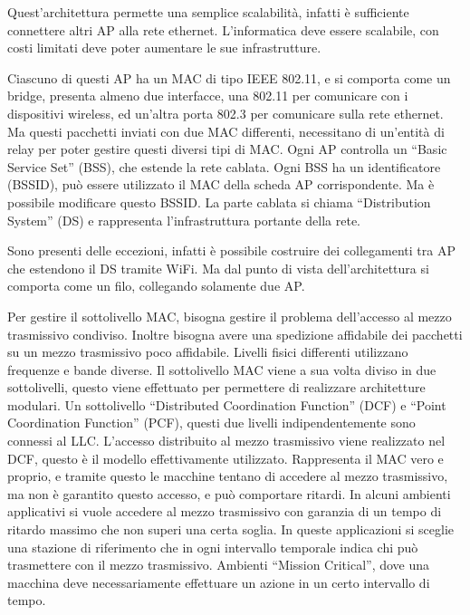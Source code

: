 \documentclass{article}
\numberwithin{equation}{subsection}
\begin{document}

Quest'architettura permette una semplice scalabilità, infatti è sufficiente connettere altri AP alla rete ethernet. 
L'informatica deve essere scalabile, con costi limitati deve poter aumentare le sue infrastrutture.  


Ciascuno di questi AP ha un MAC di tipo IEEE 802.11, e si comporta come un bridge, presenta almeno due interfacce, una 802.11 per comunicare con i dispositivi wireless, 
ed un'altra porta 802.3 per comunicare sulla rete ethernet. Ma questi pacchetti inviati con due MAC differenti, necessitano di un'entità di relay per poter 
gestire questi diversi tipi di MAC. Ogni AP controlla un ``Basic Service Set'' (BSS), che estende la rete cablata. Ogni BSS ha un identificatore (BSSID), può essere 
utilizzato il MAC della scheda AP corrispondente. Ma è possibile modificare questo BSSID. 
La parte cablata si chiama ``Distribution System'' (DS) e rappresenta l'infrastruttura portante della rete. 

Sono presenti delle eccezioni, infatti è possibile costruire dei collegamenti tra AP che estendono il DS tramite WiFi. Ma dal punto di vista dell'architettura si comporta 
come un filo, collegando solamente due AP. 


Per gestire il sottolivello MAC, bisogna gestire il problema dell'accesso al mezzo trasmissivo condiviso. Inoltre bisogna avere una spedizione affidabile dei pacchetti 
su un mezzo trasmissivo poco affidabile. 
Livelli fisici differenti utilizzano frequenze e bande diverse. Il sottolivello MAC viene a sua volta diviso in due sottolivelli, questo viene effettuato per permettere 
di realizzare architetture modulari. 
Un sottolivello ``Distributed Coordination Function'' (DCF) e ``Point Coordination Function'' (PCF), questi due livelli indipendentemente sono connessi al LLC. 
L'accesso distribuito al mezzo trasmissivo viene realizzato nel DCF, questo è il modello effettivamente utilizzato. Rappresenta il MAC vero e proprio, e tramite questo 
le macchine tentano di accedere al mezzo trasmissivo, ma non è garantito questo accesso, e può comportare ritardi. 
In alcuni ambienti applicativi si vuole accedere al mezzo trasmissivo con garanzia di un tempo di ritardo massimo che non superi una certa soglia. In queste 
applicazioni si sceglie una stazione di riferimento che in ogni intervallo temporale indica chi può trasmettere con il mezzo trasmissivo. Ambienti ``Mission Critical'', 
dove una macchina deve necessariamente effettuare un azione in un certo intervallo di tempo. 
\end{document}
